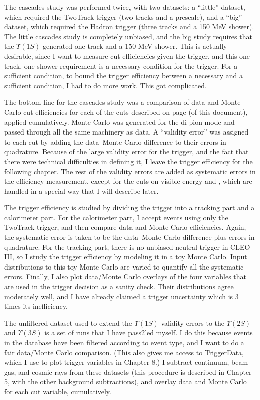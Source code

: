 \documentclass[12pt]{article}
\begin{document}
The cascades study was performed twice, with two datasets: a
``little'' dataset, which required the TwoTrack trigger (two tracks
and a prescale), and a ``big'' dataset, which required the Hadron
trigger (three tracks and a 150 MeV shower).  The little cascades
study is completely unbiased, and the big study requires that the
$\Upsilon(1S)$ generated one track and a 150 MeV shower.  This is
actually desirable, since I want to measure cut efficiencies given the
trigger, and this one track, one shower requirement is a necessary
condition for the trigger.  For a sufficient condition, to bound the
trigger efficiency between a necessary and a sufficient condition, I
had to do more work.  This got complicated.

The bottom line for the cascades study was a comparison of data and
Monte Carlo cut efficiencies for each of the cuts described on page
\pageref{wonderfulcuts} (of this document), applied cumulatively.
Monte Carlo was generated for the di-pion mode and passed through all
the same machinery as data.  A ``validity error'' was assigned to each
cut by adding the data--Monte Carlo difference to their errors in
quadrature.  Because of the large validity error for the trigger, and
the fact that there were technical difficulties in defining it, I
leave the trigger efficiency for the following chapter.  The rest of
the validity errors are added as systematic errors in the efficiency
measurement, except for the cuts on visible energy and \lfourdec,
which are handled in a special way that I will describe later.

The trigger efficiency is studied by dividing the trigger into a
tracking part and a calorimeter part.  For the calorimeter part, I
accept events using only the TwoTrack trigger, and then compare data
and Monte Carlo efficiencies.  Again, the systematic error is taken to
be the data--Monte Carlo difference plus errors in quadrature.  For
the tracking part, there is no unbiased neutral trigger in CLEO-III,
so I study the trigger efficiency by modeling it in a toy Monte Carlo.
Input distributions to this toy Monte Carlo are varied to quantify all
the systematic errors.  Finally, I also plot data/Monte Carlo overlays
of the four variables that are used in the trigger decision as a
sanity check.  Their distributions agree moderately well, and I have
already claimed a trigger uncertainty which is 3 times its
inefficiency.

The unfiltered dataset used to extend the $\Upsilon(1S)$ validity
errors to the $\Upsilon(2S)$ and $\Upsilon(3S)$ is a set of runs that
I have pass2'ed myself.  I do this because events in the database have
been filtered according to event type, and I want to do a fair
data/Monte Carlo comparison.  (This also gives me access to
TriggerData, which I use to plot trigger variables in Chapter 8.)  I
subtract continuum, beam-gas, and cosmic rays from these datasets
(this procedure is described in Chapter 5, with the other background
subtractions), and overlay data and Monte Carlo for each cut variable,
cumulatively.
\end{document}
